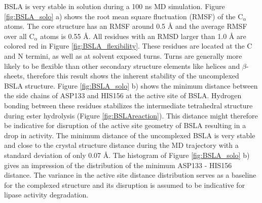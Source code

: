 \documentclass[english, a4paper, 12pt, titlepage, draft]{article}
\begin{document}
BSLA is very stable in solution during a 100 ns MD simulation.
Figure \ref{fig:BSLA_solo} a) shows the root mean square fluctuation (RMSF) of the C$_{\alpha}$ atoms.
The core structure has an RMSF around 0.5 \r{A} and the average RMSF over all C$_{\alpha}$ atoms is 0.55 \r{A}.
All residues with an RMSD larger than 1.0 \r{A} are colored red in Figure \ref{fig:BSLA_flexibility}.
These residues are located at the C and N termini, as well as at solvent exposed turns.
Turns are generally more likely to be flexible than other secondary structure elements like helices and $\beta$-sheets, therefore this result shows the inherent stability of the uncomplexed BSLA structure.
Figure \ref{fig:BSLA_solo} b) shows the minimum distance between the side chains of ASP133 and HIS156 at the active site of BSLA.
Hydrogen bonding between these residues stabilizes the intermediate tetrahedral structure during ester hydrolysis (Figure \ref{fig:BSLAreaction}).
This distance might therefore be indicative for disruption of the active site geometry of BSLA resulting in a drop in activity.
The minimum distance of the uncomplexed BSLA is very stable and close to the crystal structure distance during the MD trajectory with a standard deviation of only 0.07 \r{A}.
The histogram of Figure \ref{fig:BSLA_solo} b) gives an impression of the distribution of the minimum ASP133 - HIS156 distance.
The variance in the active site distance distribution serves as a baseline for the complexed structure and its disruption is assumed to be indicative for lipase activity degradation.
\end{document}
